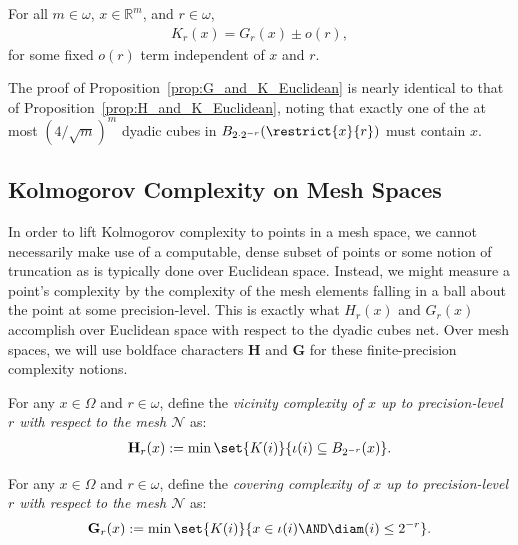 \begin{proposition}
    For all $m \in \omega$, $x \in \mathbb{R}^m$, and $r \in \omega$,
    \begin{align*}
        K_r(x) = G_r(x) \pm o(r),
    \end{align*}
    for some fixed $o(r)$ term independent of $x$ and $r$.
    \label{prop:G_and_K_Euclidean}
\end{proposition}
The proof of Proposition~\ref{prop:G_and_K_Euclidean} is nearly identical to that of Proposition~\ref{prop:H_and_K_Euclidean}, noting that exactly one of the at most $(4 / \sqrt{m})^m$ dyadic cubes in $B_{2 \cdot 2^{-r}}(\restrict{x}{r})$ must contain $x$. 

\subsection{Kolmogorov Complexity on Mesh Spaces}

In order to lift Kolmogorov complexity to points in a mesh space, we cannot necessarily make use of a computable, dense subset of points or some notion of truncation as is typically done over Euclidean space. Instead, we might measure a point's complexity by the complexity of the mesh elements falling in a ball about the point at some precision-level. This is exactly what $H_r(x)$ and $G_r(x)$ accomplish over Euclidean space with respect to the dyadic cubes net. Over mesh spaces, we will use boldface characters $\mathbf{H}$ and $\mathbf{G}$ for these finite-precision complexity notions.

\begin{definition}
    For any $x \in \Omega$ and $r \in \omega$, define the \textit{vicinity complexity of $x$ up to precision-level $r$ with respect to the mesh $\mathcal{N}$} as:
    \begin{align*}
        \mathbf{H}_r(x) := \min \set{K(i)}{\iota(i) \subseteq B_{2^{-r}}(x)}.
    \end{align*}
\end{definition}

\begin{definition}
    For any $x \in \Omega$ and $r \in \omega$, define the \textit{covering complexity of $x$ up to precision-level $r$ with respect to the mesh $\mathcal{N}$} as:
    \begin{align*}
        \mathbf{G}_r(x) := \min \set{K(i)}{x \in \iota(i) \AND \diam(i) \leq 2^{-r}}.
    \end{align*}
\end{definition}

